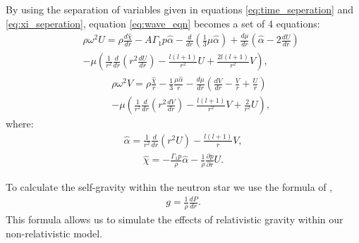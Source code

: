 \documentclass[fleqn,usenatbib]{mnras}
\begin{document}
\hspace{\parindent}By using the separation of variables given in equations \ref{eq:time_seperation} and \ref{eq:xi_seperation}, equation \ref{eq:wave_eqn} becomes a set of 4 equations:%
\begin{align}\nonumber
&&\rho\omega^2U=\rho\frac{d\hat{\chi}}{dr}-A\Gamma_1 p\hat{\alpha}-\frac{d}{dr}\left(\frac{1}{3}\mu\hat{\alpha}\right)+\frac{d\mu}{dr}\left(\hat{\alpha}-2\frac{dU}{dr}\right)\\
&&-\mu\left(\frac{1}{r^2}\frac{d}{dr}\left( r^2\frac{dU}{dr}\right)-\frac{l(l+1)}{r^2}U+\frac{2l(l+1)}{r^2}V\right),
\label{eq:Ueqn}
\end{align}
\begin{align}\nonumber
&&\rho\omega^2V=\rho\frac{\hat{\chi}}{r}-\frac{1}{3}\frac{\mu\hat{\alpha}}{r}-\frac{d\mu}{dr}\left(\frac{dV}{dr}-\frac{V}{r}+\frac{U}{r}\right)\\
&&-\mu\left(\frac{1}{r^2}\frac{d}{dr}\left(r^2\frac{dV}{dr}\right)-\frac{l(l+1)}{r^2}V+\frac{2}{r^2}U\right),
\label{eq:Veqn}
\end{align}
\noindent where:
\begin{align}
\hat{\alpha}=\frac{1}{r^2}\frac{d}{dr}(r^2U)-\frac{l(l+1)}{r}V,
\label{eq:alphahat}
\end{align}
\begin{align}
\hat{\chi}=-\frac{\Gamma_1p}{\rho}\hat{\alpha}-\frac{1}{\rho}\frac{\partial p}{\partial r}U.
\label{eq:chihat}
\end{align}

\hspace{\parindent}To calculate the self-gravity within the neutron star we use the formula of \citet{reisenegger1992new},
\begin{align}
g=\frac{1}{\rho}\frac{dP}{dr}.
\label{eq:rel_grav}
\end{align}
\noindent This formula allows us to simulate the effects of relativistic gravity within our non-relativistic model.








\iffalse
\end{document}
